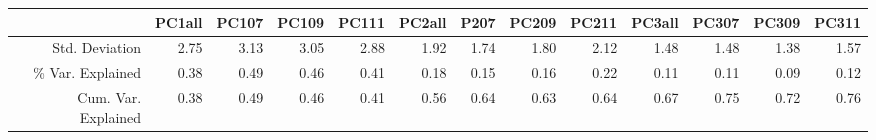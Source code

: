 \begin{table}[ht]
\centering
\begin{tabular}{rrrrrrrrrrrrr}
  \hline
 & PC1all & PC107 & PC109 & PC111 & PC2all & P207 & PC209 & PC211 & PC3all & PC307 & PC309 & PC311 \\ 
  \hline
Std. Deviation & 2.75 & 3.13 & 3.05 & 2.88 & 1.92 & 1.74 & 1.80 & 2.12 & 1.48 & 1.48 & 1.38 & 1.57 \\ 
  \% Var. Explained & 0.38 & 0.49 & 0.46 & 0.41 & 0.18 & 0.15 & 0.16 & 0.22 & 0.11 & 0.11 & 0.09 & 0.12 \\ 
  Cum. Var. Explained & 0.38 & 0.49 & 0.46 & 0.41 & 0.56 & 0.64 & 0.63 & 0.64 & 0.67 & 0.75 & 0.72 & 0.76 \\ 
   \hline
\end{tabular}
\end{table}
